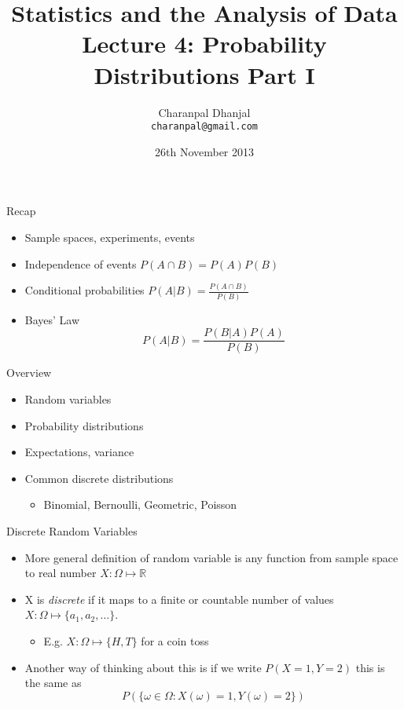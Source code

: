 \documentclass{beamer}
\title{Statistics and the Analysis of Data\\ Lecture 4: Probability Distributions Part I}
\author{Charanpal Dhanjal \\ \texttt{charanpal@gmail.com}}
\institute{\'{E}cole des Ponts}
\date{26th November 2013}
\begin{document}
\frame{\titlepage}


\begin{frame}{Recap}  
\begin{itemize} 
\item Sample spaces, experiments, events 
\item Independence of events   $P(A \cap B) = P(A)P(B)$
\item Conditional probabilities  $P(A | B) = \frac{P(A \cap B)}{P(B)}$
\item Bayes' Law 
\begin{displaymath}
 P(A | B) = \frac{P(B | A)P(A)}{P(B)}
\end{displaymath}
\end{itemize}
\end{frame}

\begin{frame}{Overview}
\begin{itemize} 
\item Random variables 
\item Probability distributions
\item Expectations, variance 
\item Common discrete distributions 
\begin{itemize}
\item Binomial, Bernoulli, Geometric, Poisson 
\end{itemize}  
\end{itemize}
\end{frame}

\begin{frame}{Discrete Random Variables} 
\begin{itemize} 
 \item More general definition of random variable is any function from sample space to real number $X: \Omega \mapsto \mathbb{R}$ 
\item X is \emph{discrete} if it maps to a finite or countable number of values $X: \Omega \mapsto \{a_1, a_2, \ldots \}$. 
\begin{itemize} 
\item E.g. $X: \Omega \mapsto \{H, T\}$ for a coin toss 
\end{itemize} 
 \item Another way of thinking about this is if we write $P(X=1, Y=2)$ this is the same as 
 \begin{displaymath}
  P(\{\omega \in \Omega: X(\omega) = 1, Y(\omega) = 2\}) 
 \end{displaymath}
 \end{itemize}
\end{frame}
\end{document}
